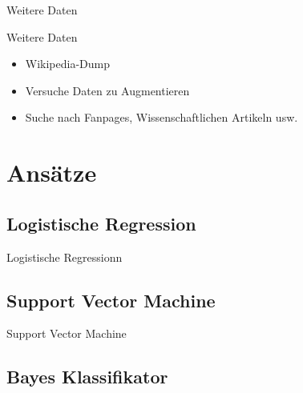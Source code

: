 \documentclass[aspectratio=169]{beamer} %
\begin{document}
\begin{frame}{Weitere Daten}
    \begin{block}{Weitere Daten}
        \begin{itemize}
            \item Wikipedia-Dump
            \item Versuche Daten zu Augmentieren
            \item Suche nach Fanpages, Wissenschaftlichen Artikeln usw.
        \end{itemize}
    \end{block}
\end{frame}


\section{Ans\"atze}

\subsection{Logistische Regression}

\begin{frame}{Logistische Regressionn}

\end{frame}

\subsection{Support Vector Machine}

\begin{frame}{Support Vector Machine}

\end{frame}

\subsection{Bayes Klassifikator}
\end{document}
